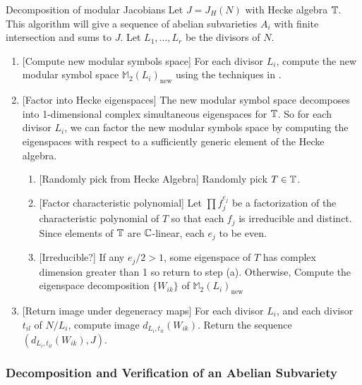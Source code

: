 \documentclass{article}
\begin{document}
\begin{algorithm}{Decomposition of modular Jacobians}
	\label{alg:decomp_jacobian}
	Let $J=J_H(N)$ with Hecke algebra $\mathbb{T}$. This algorithm will give a sequence
	of abelian subvarieties $A_i$ with finite intersection and sums to $J$. Let
	$L_1,\ldots, L_r$ be the divisors of $N$.
	\begin{enumerate}
		\item{} [Compute new modular symbols space]
		      For each divisor $L_i$, compute the new modular symbol space
		      $\mathbb{M}_2(L_i)_\mathrm{new}$ using the techniques in \cite[\S
			      8]{stein:modform}.
		\item{} [Factor into Hecke eigenspaces]
		      The new modular symbol space decomposes into 1-dimensional complex
		      simultaneous eigenspaces for $\mathbb{T}$. So for each divisor $L_i$, we can
		      factor the new modular symbols space by computing the eigenspaces
		      with respect to a sufficiently generic element of the Hecke algebra.
		      \begin{enumerate}
			      \item{} [Randomly pick from Hecke Algebra]
			            Randomly pick $T\in \mathbb{T}$.
			      \item{} [Factor characteristic polynomial]
			            Let $\prod f_j ^{e_j}$ be a factorization of the characteristic
			            polynomial of $T$ so that each $f_j$ is irreducible and
			            distinct. Since elements of $\mathbb{T}$ are $\mathbb{C}$-linear, each
			            $e_j$ to be even.
			      \item{} [Irreducible?]
			            If any $e_j/2 > 1$, some eigenspace of $T$ has complex
			            dimension greater than 1 so return to step (a). Otherwise,
			            Compute the eigenspace decomposition $\{W_{ik}\}$ of
			            $\mathbb{M}_2(L_i)_\mathrm{new}$
		      \end{enumerate}
		\item{} [Return image under degeneracy maps]
		      For each divisor $L_i$, and each divisor $t_{il}$ of $N/L_i$,
		      compute image $d_{L_i, t_{il}}(W_{ik})$. Return the sequence
		      $(d_{L_i, t_{il}}(W_{ik}), J)$.
	\end{enumerate}
\end{algorithm}

\subsubsection{Decomposition and Verification of an Abelian Subvariety}
\label{sec:decomp_verify}
\end{document}
